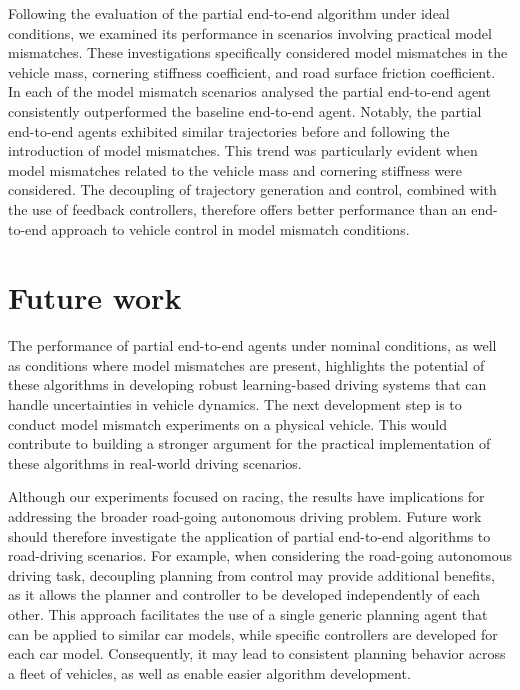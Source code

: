 Following the evaluation of the partial end-to-end algorithm under ideal conditions, we examined its performance in scenarios involving practical model mismatches. 
These investigations specifically considered model mismatches in the vehicle mass, cornering stiffness coefficient, and road surface friction coefficient.
In each of the model mismatch scenarios analysed the partial end-to-end agent consistently outperformed the baseline end-to-end agent. 
Notably, the partial end-to-end agents exhibited similar trajectories before and following the introduction of model mismatches. 
This trend was particularly evident when model mismatches related to the vehicle mass and cornering stiffness were considered.
The decoupling of trajectory generation and control, combined with the use of feedback controllers, therefore offers better performance than an end-to-end approach to vehicle control in model mismatch conditions.



\section{Future work}

The performance of partial end-to-end agents under nominal conditions, as well as conditions where model mismatches are present, highlights the potential of these algorithms in developing robust learning-based driving systems that can handle uncertainties in vehicle dynamics.
The next development step is to conduct model mismatch experiments on a physical vehicle.
This would contribute to building a stronger argument for the practical implementation of these algorithms in real-world driving scenarios.


Although our experiments focused on racing, the results have implications for addressing the broader road-going autonomous driving problem.
Future work should therefore investigate the application of partial end-to-end algorithms to road-driving scenarios.
For example, when considering the road-going autonomous driving task, decoupling planning from control may provide additional benefits, as it allows the planner and controller to be developed independently of each other.
This approach facilitates the use of a single generic planning agent that can be applied to similar car models, while specific controllers are developed for each car model.
Consequently, it may lead to consistent planning behavior across a fleet of vehicles, as well as enable easier algorithm development.


